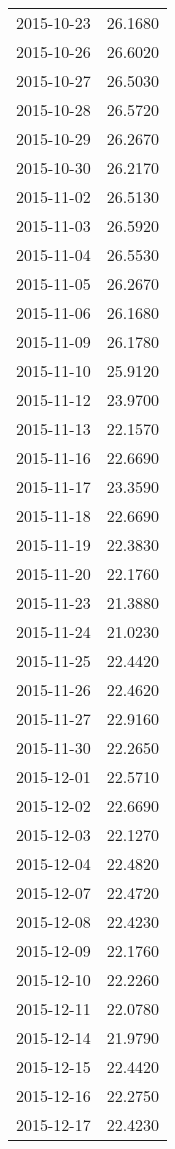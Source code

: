 \begin{tabular}{lr}
2015-10-23 &     26.1680 \\
2015-10-26 &     26.6020 \\
2015-10-27 &     26.5030 \\
2015-10-28 &     26.5720 \\
2015-10-29 &     26.2670 \\
2015-10-30 &     26.2170 \\
2015-11-02 &     26.5130 \\
2015-11-03 &     26.5920 \\
2015-11-04 &     26.5530 \\
2015-11-05 &     26.2670 \\
2015-11-06 &     26.1680 \\
2015-11-09 &     26.1780 \\
2015-11-10 &     25.9120 \\
2015-11-12 &     23.9700 \\
2015-11-13 &     22.1570 \\
2015-11-16 &     22.6690 \\
2015-11-17 &     23.3590 \\
2015-11-18 &     22.6690 \\
2015-11-19 &     22.3830 \\
2015-11-20 &     22.1760 \\
2015-11-23 &     21.3880 \\
2015-11-24 &     21.0230 \\
2015-11-25 &     22.4420 \\
2015-11-26 &     22.4620 \\
2015-11-27 &     22.9160 \\
2015-11-30 &     22.2650 \\
2015-12-01 &     22.5710 \\
2015-12-02 &     22.6690 \\
2015-12-03 &     22.1270 \\
2015-12-04 &     22.4820 \\
2015-12-07 &     22.4720 \\
2015-12-08 &     22.4230 \\
2015-12-09 &     22.1760 \\
2015-12-10 &     22.2260 \\
2015-12-11 &     22.0780 \\
2015-12-14 &     21.9790 \\
2015-12-15 &     22.4420 \\
2015-12-16 &     22.2750 \\
2015-12-17 &     22.4230 \\

\end{tabular}
